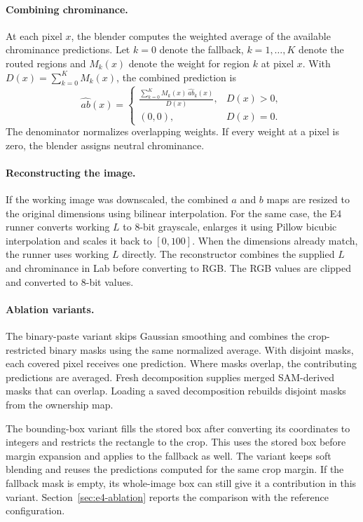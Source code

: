 \documentclass{FastFyp}
\begin{document}
\paragraph{Combining chrominance.} At each pixel $x$, the blender computes the
weighted average of the available chrominance predictions. Let $k=0$ denote
the fallback, $k=1,\ldots,K$ denote the routed regions and $M_k(x)$ denote
the weight for region $k$ at pixel $x$. With $D(x)=\sum_{k=0}^{K} M_k(x)$,
the combined prediction is
\begin{equation}
\widehat{ab}(x)=
\begin{cases}
\displaystyle\frac{\sum_{k=0}^{K} M_k(x)\,\widehat{ab}_k(x)}{D(x)},
& D(x)>0,\\[6pt]
(0,0), & D(x)=0.
\end{cases}
\end{equation}
The denominator normalizes overlapping weights. If every weight at a pixel
is zero, the blender assigns neutral chrominance.

\paragraph{Reconstructing the image.} If the working image was downscaled, the
combined $a$ and $b$ maps are resized to the original dimensions using bilinear
interpolation. For the same case, the E4 runner converts working $L$ to 8-bit
grayscale, enlarges it using Pillow bicubic interpolation and scales it back
to $[0,100]$. When the dimensions already match, the runner uses working $L$
directly. The reconstructor combines the supplied $L$ and chrominance in Lab
before converting to RGB. The RGB values are clipped and converted to 8-bit
values.

\paragraph{Ablation variants.} The binary-paste variant skips Gaussian smoothing
and combines the crop-restricted binary masks using the same normalized
average. With disjoint masks, each covered pixel receives one prediction.
Where masks overlap, the contributing predictions are averaged. Fresh
decomposition supplies merged SAM-derived masks that can overlap. Loading a
saved decomposition rebuilds disjoint masks from the ownership map.

The bounding-box variant fills the stored box after converting its coordinates
to integers and restricts the rectangle to the crop. This uses the stored box
before margin expansion and applies to the fallback as well. The variant keeps
soft blending and reuses the predictions computed for the same crop margin.
If the fallback mask is empty, its whole-image box can still give it a
contribution in this variant. Section~\ref{sec:e4-ablation} reports the comparison with the
reference configuration.
\end{document}
